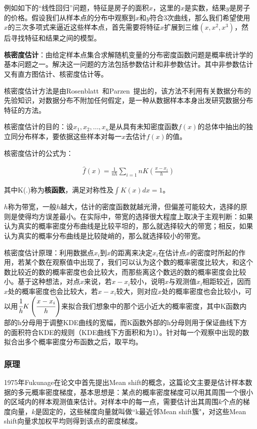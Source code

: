 \documentclass[12pt]{article}
\begin{document}
例如如下的“线性回归”问题，特征是房子的面积$x$，这里的$x$是实数，结果$y$是房子的价格。假设我们从样本点的分布中观察到$x$和$y$符合$3$次曲线，那么我们希望使用$x$的三次多项式来逼近这些样本点，首先需要将特征$x$扩展到三维$(x, x^2, x^3)$，然后寻找特征和结果之间的模型。

\textbf{核密度估计}：由给定样本点集合求解随机变量的分布密度函数问题是概率统计学的基本问题之一。解决这一问题的方法包括参数估计和非参数估计。其中非参数估计又有直方图估计、核密度估计等。

核密度估计方法是由Rosenblatt~\cite{rosenblatt1956remarks}和Parzen~\cite{parzen1962estimation}提出的，该方法不利用有关数据分布的先验知识，对数据分布不附加任何假定，是一种从数据样本本身出发研究数据分布特征的方法。

核密度估计的目的：设$x_1, x_2, \ldots, x_n$是从具有未知密度函数$f(x)$的总体中抽出的独立同分布样本，要依据这些样本对每一$x$去估计$f(x)$的值。

核密度估计的公式为：

\begin{align}
\hat{f}(x) = \frac{1}{nh}\sum_{i=1}{n}K(\frac{x-x_i}{h})
\end{align}

其中K(.)称为\textbf{核函数}，满足对称性及$\int K(x)dx=1$。

$h$称为带宽，一般$h$越大，估计的密度函数就越光滑，但偏差可能较大，选择的原则是使得均方误差最小。在实际中，带宽的选择很大程度上取决于主观判断：如果认为真实的概率密度分布曲线是比较平坦的，那么就选择较大的带宽；相反，如果认为真实的概率分布曲线是比较陡峭的，那么就选择较小的带宽。

核密度估计原理：利用数据点$x_i$到$x$的距离来决定$x_i$在估计点$x$的密度时所起的作用，若某个数在观察值中出现了，我们可以认为这个数的概率密度比较大，和这个数比较近的数的概率密度也会比较大，而那些离这个数远的数的概率密度会比较小。基于这种想法，对点$x$来说，若$x-x_i$较小，说明$x$与观测值$x_i$相距较近，因而$x$处的概率密度也会比较大，若$x-x_i$较大，则对应$x$处的概率密度也会比较小，可以用$\cfrac{1}{h}K\left(\cfrac{x-x_i}{h}\right)$来拟合我们想象中的那个远小近大的概率密度，其中K函数内部的h分母用于调整KDE曲线的宽幅，而K函数外部的h分母则用于保证曲线下方的面积符合KDE的规则（KDE曲线下方面积和为1）。针对每一个观察中出现的数拟合出多个概率密度分布函数之后，取平均。

\subsubsection{原理}

1975年Fukunage在论文\cite{fukunaga1975estimation}中首先提出Mean shift的概念，这篇论文主要是估计样本数据的多元概率密度梯度，基本思想是：某点的概率密度梯度可以用其周围一个很小的区域内的样本观测值来估计。对样本中的每一点，需要估计出其周围$k$个点的梯度向量，$k$是固定的，这些梯度向量就叫做“k最近邻Mean shift簇"，对这些Mean shift向量求加权平均则得到该点的密度梯度。
\end{document}
